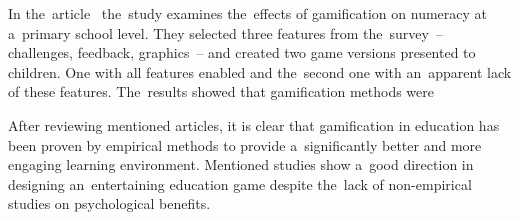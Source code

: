 In the~article~\cite{nand_2019_engaging} the~study examines the~effects of gamification on numeracy at a~primary school level.
They selected three features from the~survey~-- challenges, feedback, graphics~-- and created two game versions presented to children.
One with all features enabled and the~second one with an~apparent lack of these features.
The~results showed that gamification methods were 

After reviewing mentioned articles, it is clear that gamification in education has been proven by empirical methods to provide a~significantly better and more engaging learning environment.
Mentioned studies show a~good direction in designing an~entertaining education game despite the~lack of non-empirical studies on psychological benefits.
